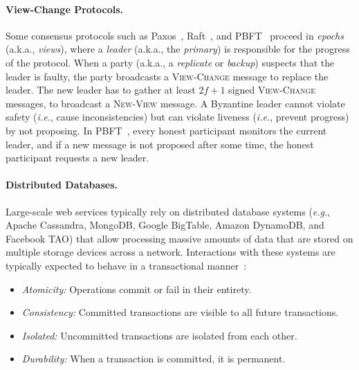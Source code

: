 \documentclass[11pt]{article}
\newcommand{\eg}{\textit{e.g.}}
\newcommand{\ie}{\textit{i.e.}}
\theoremstyle{mytheoremstyle}
\begin{document}
\paragraph{View-Change Protocols.} Some consensus protocols such as Paxos~\cite{lamport:1998:Paxos}, Raft~\cite{raft:2014}, and PBFT~\cite{pbft:99} proceed in \emph{epochs} (a.k.a., \emph{views}), where a \emph{leader} (a.k.a., the \emph{primary}) is responsible for the progress of the protocol. When a party (a.k.a., a \emph{replicate} or \emph{backup}) suspects that the leader is faulty, the party broadcasts a \textsc{View-Change} message to replace the leader. The new leader has to gather at least $2f+1$ signed \textsc{View-Change} messages, to broadcast a \textsc{New-View} message. A Byzantine leader cannot violate safety (\ie, cause inconsistencies) but can violate liveness (\ie, prevent progress) by not proposing. In PBFT~\cite{pbft:99}, every honest participant monitors the current leader, and if a new message is not proposed after some time, the honest participant requests a new leader.


\paragraph{Distributed Databases.} Large-scale web services typically rely on distributed database systems (\eg, Apache Cassandra, MongoDB, Google BigTable, Amazon DynamoDB, and Facebook TAO) that allow processing massive amounts of data that are stored on multiple storage devices across a network. Interactions with these systems are typically expected to behave in a transactional manner~\cite{gilbert2002brewer}: 
\begin{itemize}
	\item \textit{Atomicity:} Operations commit or fail in their entirety.
	\item \textit{Consistency:} Committed transactions are visible to all future transactions.
	\item \textit{Isolated:} Uncommitted transactions are isolated from each other.
	\item \textit{Durability:} When a transaction is committed, it is permanent.
\end{itemize}
\end{document}

